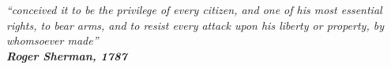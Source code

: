 \chapter*{}


\vfill
\hfill
\begin{minipage}{.6\textwidth}
\begin{center}
\emph{``conceived it to be the privilege of every citizen, and one of his most essential rights, to bear arms, and to resist every attack upon his liberty or property, by whomsoever made''\\[3mm]
\bfseries  Roger Sherman, 1787}
\end{center}
\end{minipage}


%
%
%
%
%
%
%
